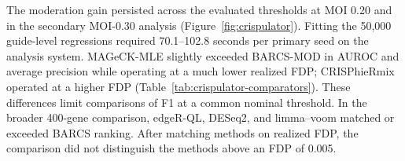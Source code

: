 The moderation gain persisted across the evaluated thresholds at MOI 0.20 and
in the secondary MOI-0.30 analysis (Figure~\ref{fig:crispulator}).  Fitting
the 50,000 guide-level regressions required 70.1--102.8 seconds per primary
seed on the analysis system. MAGeCK-MLE slightly exceeded BARCS-MOD in AUROC
and average precision while operating at a much lower realized FDP;
CRISPhieRmix operated at a higher FDP
(Table~\ref{tab:crispulator-comparators}).  These differences limit
comparisons of F1 at a common nominal threshold.  In the broader 400-gene
comparison, edgeR-QL, DESeq2, and limma--voom matched or exceeded BARCS
ranking.  After matching methods on realized FDP, the comparison did not
distinguish the methods above an FDP of 0.005.
